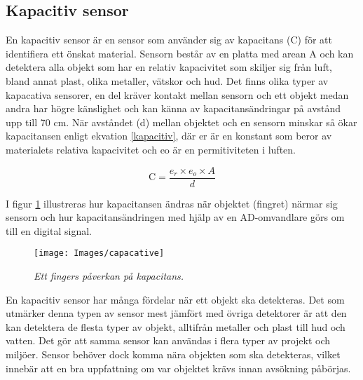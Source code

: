 \documentclass[11pt]{article}
\begin{document}
\begin{flushleft}
\subsection{Kapacitiv sensor}
En kapacitiv sensor är en sensor som använder sig av kapacitans (C) för att identifiera ett önskat material. Sensorn består av en platta med arean A och kan detektera alla objekt som har en relativ kapacivitet som skiljer sig från luft, bland annat plast, olika metaller, vätskor och hud. Det finns olika typer av kapacativa sensorer, en del kräver kontakt mellan sensorn och ett objekt medan andra har högre känslighet och kan känna av kapacitansändringar på avstånd upp till 70 cm. När avståndet (d) mellan objektet och en sensorn minskar så ökar kapacitansen enligt ekvation \ref{kapacitiv}, där er är en konstant som beror av materialets relativa kapacivitet och eo är en permitiviteten i luften.\cite{website:capacative}


\begin{equation}\label{kapacitiv}
	\textrm{C} = \frac {e_{r} \times e_{o} \times A}{d}						
\end{equation}

I figur \ref{capacative} illustreras hur kapacitansen ändras när objektet (fingret) närmar sig sensorn och hur kapacitansändringen med hjälp av en AD-omvandlare görs om till en digital signal. 

\begin{figure}[htbp]
	\centering
	\texttt{[image: Images/capacative]}
	\caption{\textit{Ett fingers påverkan på kapacitans.}\label{capacative}}
\end{figure}

En kapacitiv sensor har många fördelar när ett objekt ska detekteras. Det som utmärker denna typen av sensor mest jämfört med övriga detektorer är att den kan detektera de flesta typer av objekt, alltifrån metaller och plast till hud och vatten. Det gör att samma sensor kan användas i flera typer av projekt och miljöer. Sensor behöver dock komma nära objekten som ska detekteras, vilket innebär att en bra uppfattning om var objektet krävs innan avsökning påbörjas. \cite{website:capacative}




\end{flushleft}
\end{document}
